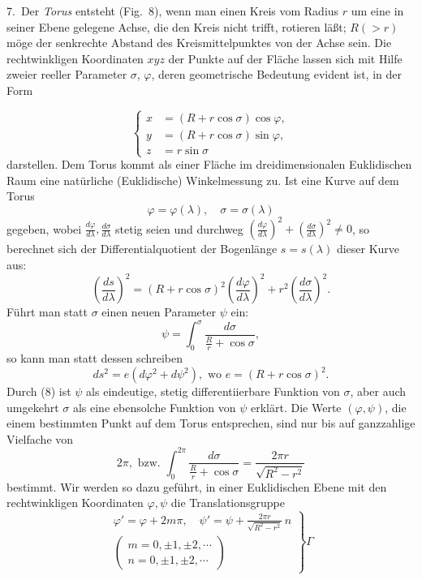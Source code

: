 \documentclass{article}
\begin{document}


7.\ Der \emph{Torus} entsteht (Fig.~8), wenn man einen Kreis vom Radius $r$ um eine in seiner Ebene gelegene Achse, die den Kreis nicht trifft, rotieren läßt; $R (> r)$ möge der senkrechte Abstand des Kreismittelpunktes von der Achse sein. Die rechtwinkligen Koordinaten $xyz$ der Punkte auf der Fläche lassen sich mit Hilfe zweier reeller Parameter $\sigma$, $\varphi$, deren geometrische Bedeutung evident ist, in der Form

\[
\left\{
\begin{aligned}
x &= (R + r \cos \sigma) \cos \varphi, \\
y &= (R + r \cos \sigma) \sin \varphi, \\
z &= r \sin \sigma
\end{aligned}
\right.
\]
darstellen. Dem Torus kommt als einer Fläche im dreidimensionalen Euklidischen Raum eine natürliche (Euklidische) Winkelmessung zu. Ist eine Kurve auf dem Torus
\[
\varphi = \varphi(\lambda), \quad \sigma = \sigma(\lambda)
\]
gegeben, wobei $\frac{d\varphi}{d\lambda}, \frac{d\sigma}{d\lambda}$ stetig seien und durchweg $\left(\frac{d\varphi}{d\lambda}\right)^2 + \left(\frac{d\sigma}{d\lambda}\right)^2 \ne 0$, so berechnet sich der Differentialquotient der Bogenlänge $s = s(\lambda)$ dieser Kurve aus:
\[
\left(\frac{ds}{d\lambda}\right)^2 = (R + r \cos \sigma)^2 \left(\frac{d\varphi}{d\lambda}\right)^2 + r^2 \left(\frac{d\sigma}{d\lambda}\right)^2.
\]
Führt man statt $\sigma$ einen neuen Parameter $\psi$ ein:
\[
\psi = \int_0^\sigma \frac{d\sigma}{\frac{R}{r} + \cos \sigma}, \tag{8}
\]
so kann man statt dessen schreiben
\[
ds^2 = e(d\varphi^2 + d\psi^2), \text{ wo } e = (R + r \cos \sigma)^2. \tag{9}
\]
Durch (8) ist $\psi$ als eindeutige, stetig differentiierbare Funktion von $\sigma$, aber auch umgekehrt $\sigma$ als eine ebensolche Funktion von $\psi$ erklärt. Die Werte $(\varphi, \psi)$, die einem bestimmten Punkt auf dem Torus entsprechen, sind nur bis auf ganzzahlige Vielfache von
\[
2\pi, \text{ bzw. } \int_0^{2\pi} \frac{d\sigma}{\frac{R}{r} + \cos \sigma} = \frac{2\pi r}{\sqrt{R^2 - r^2}}
\]
bestimmt. Wir werden so dazu geführt, in einer Euklidischen Ebene mit den rechtwinkligen Koordinaten $\varphi, \psi$ die Translationsgruppe
\[
\left.
\begin{gathered}
\varphi' = \varphi + 2m\pi, \quad \psi' = \psi + \frac{2\pi r}{\sqrt{R^2 - r^2}}\,n \\
\begin{pmatrix}
m = 0, \pm 1, \pm 2, \cdots \\
n = 0, \pm 1, \pm 2, \cdots
\end{pmatrix}
\end{gathered}
\right\} \varGamma
\]
\end{document}
